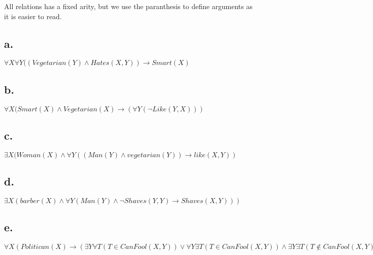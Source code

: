 \documentclass[a4paper, english, 11pt]{article}
\begin{document}
All relations has a fixed arity, but we use the paranthesis to define arguments as it is easier to read.

\subsection*{a.}

$\forall X \forall Y ((Vegetarian(Y) \wedge  Hates(X, Y)) \rightarrow Smart(X)$

\subsection*{b.}

$\forall X (Smart(X) \wedge Vegetarian(X) \rightarrow (\forall Y (\neg Like(Y, X)))$

\subsection*{c.}

$\exists X (Woman(X) \wedge \forall Y ((Man(Y) \wedge vegetarian(Y)) \rightarrow like(X, Y))$

\subsection*{d.}

$\exists X(barber(X) \wedge \forall Y (Man(Y) \wedge \neg Shaves(Y, Y) \rightarrow Shaves(X, Y)))$

\subsection*{e.}

$\forall X(Politican(X) \rightarrow (\exists Y \forall T (T \in CanFool(X, Y)) \vee \forall Y \exists T (T \in CanFool(X, Y)) \wedge \exists Y \exists T (T \not\in CanFool(X, Y))))$
\end{document}
